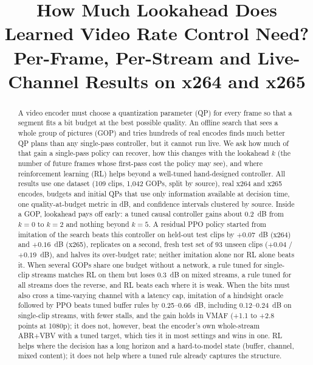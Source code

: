 \documentclass[conference]{IEEEtran}
\begin{document}
\title{How Much Lookahead Does Learned Video Rate Control Need?\\ Per-Frame, Per-Stream and Live-Channel Results on x264 and x265}

\author{
}

\maketitle

\begin{abstract}
A video encoder must choose a quantization parameter (QP) for every frame so that a segment fits a bit budget at the best possible quality. An offline search that sees a whole group of pictures (GOP) and tries hundreds of real encodes finds much better QP plans than any single-pass controller, but it cannot run live. We ask how much of that gain a single-pass policy can recover, how this changes with the lookahead $k$ (the number of future frames whose first-pass cost the policy may see), and where reinforcement learning (RL) helps beyond a well-tuned hand-designed controller. All results use one dataset (109 clips, 1{,}042 GOPs, split by source), real x264 and x265 encodes, budgets and initial QPs that use only information available at decision time, one quality-at-budget metric in dB, and confidence intervals clustered by source. Inside a GOP, lookahead pays off early: a tuned causal controller gains about 0.2~dB from $k{=}0$ to $k{=}2$ and nothing beyond $k{=}5$. A residual PPO policy started from imitation of the search beats this controller on held-out test clips by $+0.07$~dB (x264) and $+0.16$~dB (x265), replicates on a second, fresh test set of 93 unseen clips ($+0.04$ / $+0.19$~dB), and halves its over-budget rate; neither imitation alone nor RL alone beats it. When several GOPs share one budget without a network, a rule tuned for single-clip streams matches RL on them but loses 0.3~dB on mixed streams, a rule tuned for all streams does the reverse, and RL beats each where it is weak. When the bits must also cross a time-varying channel with a latency cap, imitation of a hindsight oracle followed by PPO beats tuned buffer rules by 0.25--0.66~dB, including 0.12--0.24~dB on single-clip streams, with fewer stalls, and the gain holds in VMAF (+1.1 to +2.8 points at 1080p); it does not, however, beat the encoder's own whole-stream ABR+VBV with a tuned target, which ties it in most settings and wins in one. RL helps where the decision has a long horizon and a hard-to-model state (buffer, channel, mixed content); it does not help where a tuned rule already captures the structure.
\end{abstract}
\end{document}
